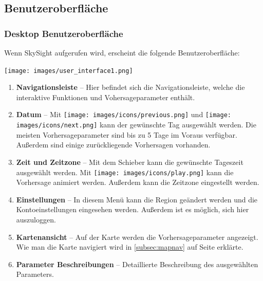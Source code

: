 \documentclass[11pt,a4paper]{article}
\begin{document}
\subsection{Benutzeroberfläche}
\subsubsection{Desktop Benutzeroberfläche}
Wenn SkySight aufgerufen wird, erscheint die folgende Benutzeroberfläche:
\begin{center}
\texttt{[image: images/user\_interface1.png]}
\end{center}
\begin{enumerate}
\item \textbf{Navigationsleiste} -- Hier befindet sich die Navigationsleiste, welche die interaktive Funktionen und Vohersageparameter enthält.
\item \textbf{Datum}  -- Mit \texttt{[image: images/icons/previous.png]} und \texttt{[image: images/icons/next.png]} kann der gewünschte Tag ausgewählt werden. Die meisten Vorhersageparameter sind bis zu 5 Tage im Voraus verfügbar. Außerdem sind einige zurückliegende Vorhersagen vorhanden.
\item \textbf{Zeit und Zeitzone} -- Mit dem Schieber kann die gewünschte Tageszeit ausgewählt werden. Mit \texttt{[image: images/icons/play.png]} kann die Vorhersage animiert werden. Außerdem kann die Zeitzone eingestellt werden.
\item \textbf{Einstellungen} -- In diesem Menü kann die Region geändert werden und die Kontoeinstellungen eingesehen werden. Außerdem ist es möglich, sich hier auszuloggen.
\item \textbf{Kartenansicht} -- Auf der Karte werden die Vorhersageparameter angezeigt. Wie man die Karte navigiert wird in \ref{subsec:mapnav} auf Seite \pageref{subsec:mapnav} erklärte.
\item \textbf{Parameter Beschreibungen} -- Detaillierte Beschreibung des ausgewählten Parameters.
\end{enumerate}
\end{document}
